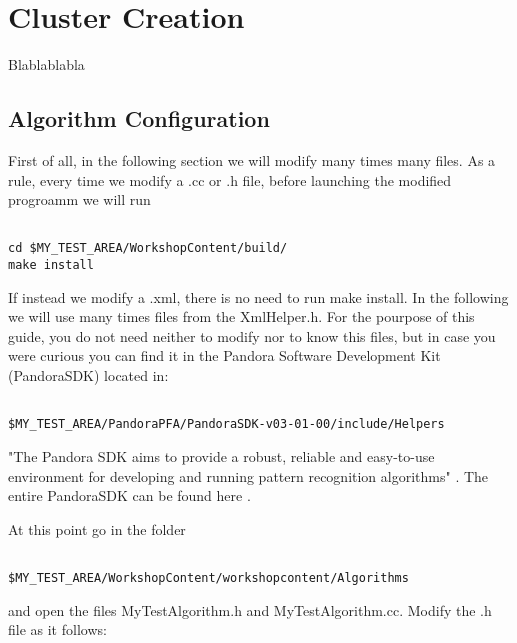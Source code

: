 \chapter{Cluster Creation}

Blablablabla

\section{Algorithm Configuration} \label{sssec:algo_config}

First of all, in the following section we will modify many times many files. As a rule, every time we modify a .cc or .h file, before launching the modified progroamm we will run

\begin{numVblock}\label{code:build}

\begin{verbatim}

cd $MY_TEST_AREA/WorkshopContent/build/
make install

\end{verbatim}
\end{numVblock}

If instead we modify a .xml, there is no need to run make install. In the following we will use many times files from the XmlHelper.h. For the pourpose of this guide, you do not need neither to modify nor to know this files, but in case you were curious you can find it in the Pandora Software Development Kit (PandoraSDK) located in:

\begin{verbatim}

$MY_TEST_AREA/PandoraPFA/PandoraSDK-v03-01-00/include/Helpers

\end{verbatim}

"The Pandora SDK aims to provide a robust, reliable and easy-to-use environment for developing and running pattern recognition algorithms" \cite{pandorasdk_paper}. The entire PandoraSDK can be found here \cite{pandora_doc}. 

At this point go in the folder

\begin{verbatim}

$MY_TEST_AREA/WorkshopContent/workshopcontent/Algorithms

\end{verbatim}

and open the files MyTestAlgorithm.h and MyTestAlgorithm.cc. Modify the .h file as it follows:

